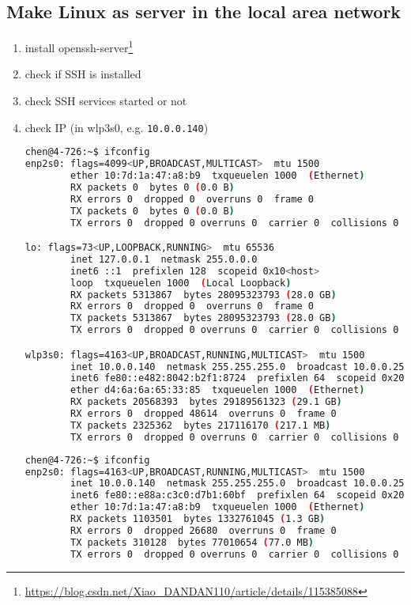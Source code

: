 \subsection{Make Linux as server in the local area network}
\begin{enumerate}
\item{} install openssh-server\footnote{\url{https://blog.csdn.net/Xiao_DANDAN110/article/details/115385088}}
\item{} check if SSH is installed
\item{} check SSH services started or not
\item{} check IP (in wlp3s0, e.g. \verb|10.0.0.140|)
\begin{lstlisting}[language=bash, caption={ifconig (wi-fi connected)}]
chen@4-726:~$ ifconfig 
enp2s0: flags=4099<UP,BROADCAST,MULTICAST>  mtu 1500
        ether 10:7d:1a:47:a8:b9  txqueuelen 1000  (Ethernet)
        RX packets 0  bytes 0 (0.0 B)
        RX errors 0  dropped 0  overruns 0  frame 0
        TX packets 0  bytes 0 (0.0 B)
        TX errors 0  dropped 0 overruns 0  carrier 0  collisions 0

lo: flags=73<UP,LOOPBACK,RUNNING>  mtu 65536
        inet 127.0.0.1  netmask 255.0.0.0
        inet6 ::1  prefixlen 128  scopeid 0x10<host>
        loop  txqueuelen 1000  (Local Loopback)
        RX packets 5313867  bytes 28095323793 (28.0 GB)
        RX errors 0  dropped 0  overruns 0  frame 0
        TX packets 5313867  bytes 28095323793 (28.0 GB)
        TX errors 0  dropped 0 overruns 0  carrier 0  collisions 0

wlp3s0: flags=4163<UP,BROADCAST,RUNNING,MULTICAST>  mtu 1500
        inet 10.0.0.140  netmask 255.255.255.0  broadcast 10.0.0.255
        inet6 fe80::e482:8042:b2f1:8724  prefixlen 64  scopeid 0x20<link>
        ether d4:6a:6a:65:33:85  txqueuelen 1000  (Ethernet)
        RX packets 20568393  bytes 29189561323 (29.1 GB)
        RX errors 0  dropped 48614  overruns 0  frame 0
        TX packets 2325362  bytes 217116170 (217.1 MB)
        TX errors 0  dropped 0 overruns 0  carrier 0  collisions 0
\end{lstlisting}
\begin{lstlisting}[language=bash, caption={ifconig (wired connected)}]
chen@4-726:~$ ifconfig
enp2s0: flags=4163<UP,BROADCAST,RUNNING,MULTICAST>  mtu 1500
        inet 10.0.0.140  netmask 255.255.255.0  broadcast 10.0.0.255
        inet6 fe80::e88a:c3c0:d7b1:60bf  prefixlen 64  scopeid 0x20<link>
        ether 10:7d:1a:47:a8:b9  txqueuelen 1000  (Ethernet)
        RX packets 1103501  bytes 1332761045 (1.3 GB)
        RX errors 0  dropped 26680  overruns 0  frame 0
        TX packets 310128  bytes 77010654 (77.0 MB)
        TX errors 0  dropped 0 overruns 0  carrier 0  collisions 0


\end{lstlisting}
\end{enumerate}
